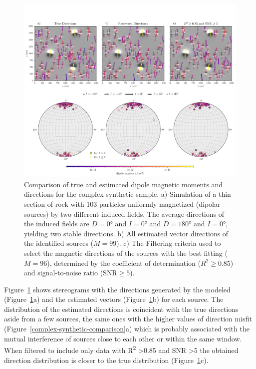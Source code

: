 \begin{figure}[tb!]
\centering
\includegraphics[width=1\linewidth]{figures/complex-synthetic-stereograms.png}
\caption{ Comparison of true and estimated dipole magnetic moments and directions for the complex synthetic sample.
a) Simulation of a thin section of rock with 103 particles uniformly magnetized (dipolar sources) by two different induced fields. The average directions of the induced fields are $D=\ang{0}$ and $I=\ang{0}$ and $D=\ang{180}$ and $I=\ang{0}$, yielding two stable directions. b) All estimated vector directions of the identified sources ($M=99$). c) The Filtering criteria used to select the magnetic directions of the sources with the best fitting ($M=96$), determined by the coefficient of determination ($R^2 \geq 0.85$) and signal-to-noise ratio ($\text{SNR} \geq 5$).
}
\label{complex-synthetic-stereograms}
\end{figure}

Figure~\ref{complex-synthetic-stereograms} shows stereograms with the directions generated by the modeled (Figure~\ref{complex-synthetic-stereograms}a) and the estimated vectors (Figure~\ref{complex-synthetic-stereograms}b) for each source. The distribution of the estimated directions is coincident with the true directions aside from a few sources, the same ones with the higher values of direction misfit (Figure~\ref{complex-synthetic-comparison}a) which is probably associated with the mutual interference of sources close to each other or within the same window. When filtered to include only data with R\textsuperscript{2} \textgreater 0.85 and SNR \textgreater 5 the obtained direction distribution is closer to the true distribution (Figure~\ref{complex-synthetic-stereograms}c).



